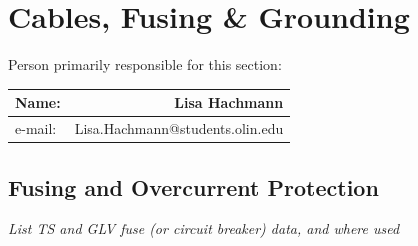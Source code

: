 \documentclass{article}
\begin{document}
\section{Cables, Fusing \& Grounding}

Person primarily responsible for this section:
    \begin{table}[H]
        \centering
        \label{responsible2}
        \begin{tabular}{lr}
        Name: & Lisa Hachmann \\ \hline
        e-mail: & Lisa.Hachmann@students.olin.edu \\ \hline
        \end{tabular}
    \end{table}

\subsection{Fusing and Overcurrent Protection}

\textit{List TS and GLV fuse (or circuit breaker) data, and where used}
\end{document}
